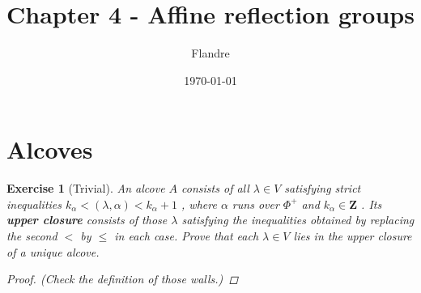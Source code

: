 \documentclass{article}
\title{Chapter 4 - Affine reflection groups}
\author{Flandre}
\date{\today}
\theoremstyle{breakstyle}
\newtheorem{exercise}{Exercise}[section]
\begin{document}
\maketitle

\setcounter{section}{2}
\section{Alcoves}

\begin{exercise}[Trivial]
An alcove $A$ consists of all $\lambda \in V$ satisfying strict inequalities
$k_{\alpha} < (\lambda, \alpha) < k_{\alpha} + 1$ , where $\alpha$ runs over
$\Phi^{+}$ and $k_{\alpha} \in \mathbf{Z}$ . Its \textbf{upper closure} consists
of those $\lambda$ satisfying the inequalities obtained by replacing the second
$<$ by $\leq$ in each case. Prove that each $\lambda \in V$ lies in the upper
closure of a unique alcove.

\begin{proof}
    \emph{(Check the definition of those walls.)}
\end{proof}

\end{exercise}
\end{document}
